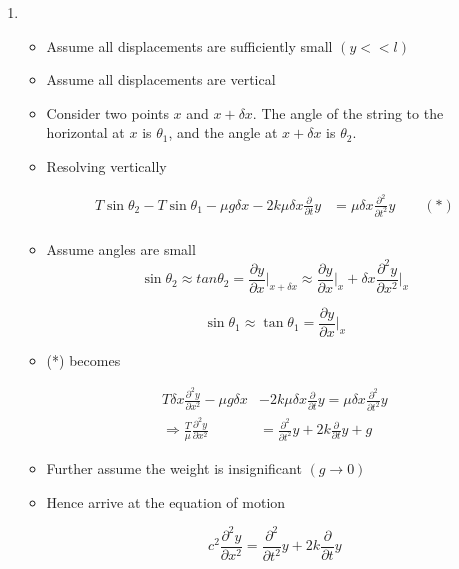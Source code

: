 \documentclass[a4paper]{article}
\begin{document}
\begin{enumerate}
	\item \begin{itemize}
		\item Assume all displacements are sufficiently small $ ( y < < l) $
		\item Assume all displacements are vertical
		\item Consider two points $ x $ and $ x + \delta x $. The angle of the string to the horizontal at $ x $ is $ \theta_{1} $, and the angle at $ x + \delta x $ is $ \theta_{2} $.
		\item Resolving vertically 
		
		\begin{align*}
		T \sin \theta_{2} -  T \sin \theta_{1} - \mu g \delta x - 2k \mu \delta x \frac{\partial  }{\partial t}y  & = \mu \delta x \frac{\partial^{2} }{\partial t^{2}} y   \qquad (*) \\
		\end{align*} 
		
		
		\item Assume angles are small
		\[ \sin \theta_{2} \approx tan \theta_{2} =  \frac{\partial y }{\partial x} \Big|_{x + \delta x} \approx \frac{\partial y }{\partial x} \Big|_{x} + \delta x \frac{\partial^{2} y }{\partial x^{2}} \Big|_{x}   \]
		
		\[ \sin \theta_{1} \approx \tan \theta_{1} = \frac{\partial y }{\partial x} \Big|_{x} \]
	
		\item (*) becomes 
		
		\begin{align*}
		T \delta x \frac{\partial^{2} y }{\partial x^{2}}   - \mu g \delta x & - 2k \mu \delta x \frac{\partial  }{\partial t}y   = \mu \delta x \frac{\partial^{2} }{\partial t^{2}} y   \\
		\Rightarrow \frac{T}{\mu} \frac{\partial^{2} y }{\partial x^{2}}  & = \frac{\partial^{2} }{\partial t^{2}} y +  2k \frac{\partial  }{\partial t}y + g
		\end{align*} 
		
		\item Further assume the weight is insignificant $ (g \to 0) $
		
		\item Hence arrive at the equation of motion 
		
		\[ c^{2} \frac{\partial^{2} y }{\partial x^{2}}   = \frac{\partial^{2} }{\partial t^{2}} y +  2k \frac{\partial  }{\partial t}y \]
		

\end{itemize}
\end{enumerate}
\end{document}
